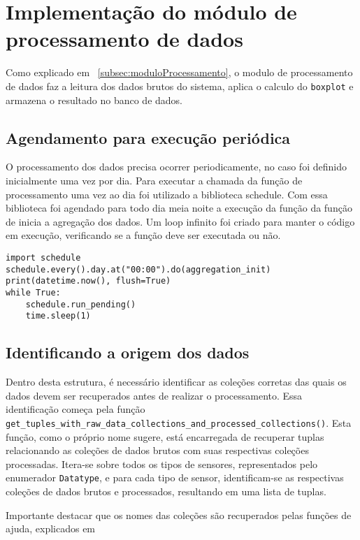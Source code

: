 \section[Implementação do módulo de processamento de dados]{Implementação do módulo de processamento de dados}\label{sec:ImplModuloProcessamento}

Como explicado em ~\ref{subsec:moduloProcessamento}, o modulo de processamento de dados faz a leitura dos dados brutos do sistema, aplica o calculo do \texttt{boxplot} e armazena o resultado no banco de dados.

\subsection{Agendamento para execução periódica}
O processamento dos dados precisa ocorrer periodicamente, no caso foi definido inicialmente uma vez por dia. Para executar a chamada da função de processamento uma vez ao dia foi utilizado a biblioteca schedule. Com essa biblioteca foi agendado para todo dia meia noite a execução da função da função de inicia a agregação dos dados. Um loop infinito foi criado para manter o código em execução, verificando se a função deve ser executada ou não.

\begin{verbatim}
import schedule
schedule.every().day.at("00:00").do(aggregation_init)
print(datetime.now(), flush=True)
while True:
    schedule.run_pending()
    time.sleep(1)
\end{verbatim}

\subsection{Identificando a origem dos dados}
Dentro desta estrutura, é necessário identificar as coleções corretas das quais os dados devem ser recuperados antes de realizar o processamento. Essa identificação começa pela função \texttt{get\_tuples\_with\_raw\_data\_collections\_and\_processed\_collections()}. Esta função, como o próprio nome sugere, está encarregada de recuperar tuplas relacionando as coleções de dados brutos com suas respectivas coleções processadas. Itera-se sobre todos os tipos de sensores, representados pelo enumerador \texttt{Datatype}, e para cada tipo de sensor, identificam-se as respectivas coleções de dados brutos e processados, resultando em uma lista de tuplas. 

Importante destacar que os nomes das coleções são recuperados pelas funções de ajuda, explicados em %

